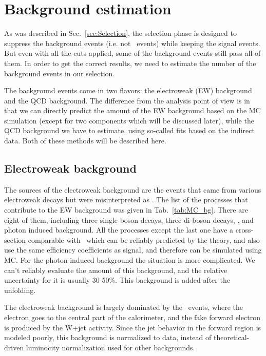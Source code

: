 \chapter{Background estimation}
\label{sec:Bkg}

As was described in Sec.~\ref{sec:Selection}, the selection phase is designed to suppress the background events (i.e. not \Zee\ events) while keeping the signal events. But even with all the cuts applied, some of the background events still pass all of them. In order to get the correct results, we need to estimate the number of the background events in our selection.

The background events come in two flavors: the electroweak (EW) background and the QCD background. The difference from the analysis point of view is in that we can directly predict the amount of the EW background based on the MC simulation (except for two components which will be discussed later), while the QCD background we have to estimate, using so-called fits based on the indirect data. Both of these methods will be described here.

\section{Electroweak background}

The sources of the electroweak background are the events that came from various electroweak decays but were misinterpreted as \Zee. The list of the processes that contribute to the EW background was given in Tab.~\ref{tab:MC_bg}. There are eight of them, including three single-boson decays, three di-boson decays, \ttbar, and photon induced background. All the processes except the last one have a cross-section comparable with \Zee\ which can be reliably predicted by the theory, and also use the same efficiency coefficients as signal, and therefore can be simulated using MC. For the photon-induced background the situation is more complicated. We can't reliably evaluate the amount of this background, and the relative uncertainty for it is usually 30-50\%. This background is added after the unfolding.

The electroweak background is largely dominated by the \Wenu\ events, where the electron goes to the central part of the calorimeter, and the fake forward electron is produced by the W+jet activity. Since the jet behavior in the forward region is modeled poorly, this background is normalized to data, instead of theoretical-driven luminocity normalization used for other backgrounds.

